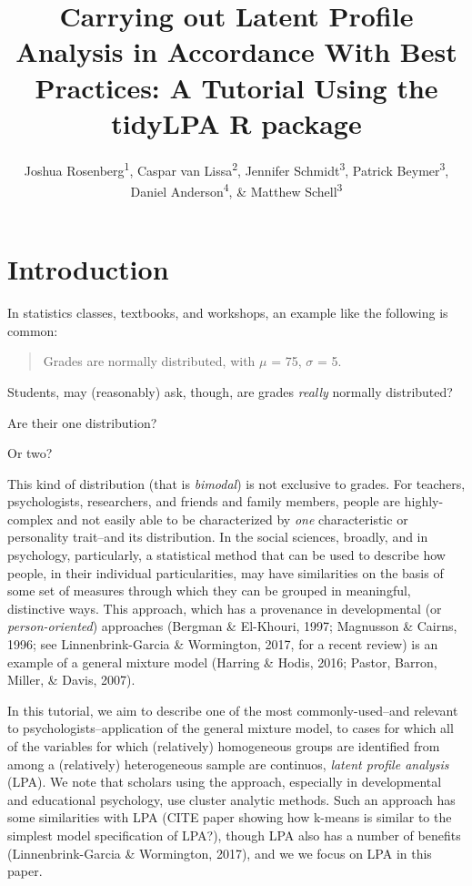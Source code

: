 \documentclass[man]{apa6}
\title{Carrying out Latent Profile Analysis in Accordance With Best Practices: A Tutorial Using the tidyLPA R package}
\author{Joshua Rosenberg\textsuperscript{1}, Caspar van Lissa\textsuperscript{2}, Jennifer Schmidt\textsuperscript{3}, Patrick Beymer\textsuperscript{3}, Daniel Anderson\textsuperscript{4}, \& Matthew Schell\textsuperscript{3}}
\date{}
\begin{document}
\maketitle

\hypertarget{introduction}{%
\section{Introduction}\label{introduction}}

In statistics classes, textbooks, and workshops, an example like the following is common:

\begin{quote}
Grades are normally distributed, with \(\mu\) = 75, \(\sigma\) = 5.
\end{quote}

Students, may (reasonably) ask, though, are grades \emph{really} normally distributed?

Are their one distribution?

Or two?

This kind of distribution (that is \emph{bimodal}) is not exclusive to grades. For
teachers, psychologists, researchers, and friends and family members, people are
highly-complex and not easily able to be characterized by \emph{one} characteristic
or personality trait--and its distribution. In the social sciences, broadly, and
in psychology, particularly, a statistical method that can be used to describe
how people, in their individual particularities, may have similarities on the
basis of some set of measures through which they can be grouped in meaningful,
distinctive ways. This approach, which has a provenance in developmental (or
\emph{person-oriented}) approaches (Bergman \& El-Khouri, 1997; Magnusson \&
Cairns, 1996; see Linnenbrink-Garcia \& Wormington, 2017, for a recent review) is
an example of a general mixture model (Harring \& Hodis, 2016; Pastor, Barron,
Miller, \& Davis, 2007).

In this tutorial, we aim to describe one of the most commonly-used--and relevant
to psychologists--application of the general mixture model, to cases for which
all of the variables for which (relatively) homogeneous groups are identified
from among a (relatively) heterogeneous sample are continuos, \emph{latent profile
analysis} (LPA). We note that scholars using the approach, especially in
developmental and educational psychology, use cluster analytic methods. Such an
approach has some similarities with LPA (CITE paper showing how k-means is
similar to the simplest model specification of LPA?), though LPA also has a
number of benefits (Linnenbrink-Garcia \& Wormington, 2017), and we we focus on
LPA in this paper.
\end{document}
